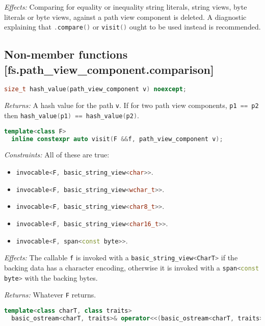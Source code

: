 \documentclass[11pt]{article}
\newcommand{\code}[2][cpp]{\lstinline[language=#1,basicstyle=\small\ttfamily]{#2}}
\newcommand{\desc}[1]{\textit{#1}}
\newcommand{\constraints}{\desc{Constraints: }}
\newcommand{\effects}{\desc{Effects: }}
\newcommand{\returns}{\desc{Returns: }}
\begin{document}
\effects Comparing for equality or inequality string literals, string views, byte literals or byte views, against a path view component is deleted. A diagnostic explaining that \code{.compare()} or \code{visit()} ought to be used instead is recommended.

\subsection*{Non-member functions [fs.path\_view\_component.comparison]}

\begin{lstlisting}[language=cpp]
  size_t hash_value(path_view_component v) noexcept;
\end{lstlisting}

\returns A hash value for the path \code{v}. If for two path view components, \code{p1 == p2} then \code{hash_value(p1) == hash_value(p2)}.\\

\begin{lstlisting}[language=cpp]
  template<class F>
  inline constexpr auto visit(F &&f, path_view_component v);
\end{lstlisting}

\constraints All of these are true:\begin{itemize}
    \item \code{invocable<F, basic_string_view<char>>}.
    \item \code{invocable<F, basic_string_view<wchar_t>>}.
    \item \code{invocable<F, basic_string_view<char8_t>>}.
    \item \code{invocable<F, basic_string_view<char16_t>>}.
    \item \code{invocable<F, span<const byte>>}.
\end{itemize}

\effects The callable \code{f} is invoked with a \code{basic_string_view<CharT>} if the backing data has a character encoding, otherwise it is invoked with a \code{span<const byte>} with the backing bytes.

\returns Whatever \code{F} returns.\\

\begin{lstlisting}[language=cpp]
  template<class charT, class traits>
  basic_ostream<charT, traits>& operator<<(basic_ostream<charT, traits>& os, path_view_component v);
\end{lstlisting}
\end{document}
